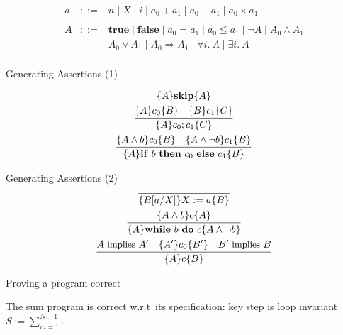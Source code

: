 \begin{frame}
    \[\begin{array}{rcl}
        a & ::= & n
                \mid X
                \mid i
                \mid a_0 + a_1
                \mid a_0 - a_1
                \mid a_0 \times a_1 \\
                \\
        A & ::= & \mathbf{true}
                \mid \mathbf{false}
                \mid a_0 = a_1
                \mid a_0 \leq a_1
                \mid \neg A
                \mid A_0 \wedge A_1 \\
             && A_0 \vee A_1
                \mid A_0 \Rightarrow A_1
                \mid \forall i.\ A
                \mid \exists i.\ A \\
    \end{array} \]
\end{frame}

\begin{frame}{Generating Assertions (1)}
    \begin{gather*}
        \infer{\{A\}\mathbf{skip}\{A\}}{} \\
        \infer{\{A\}c_0; c_1\{C\}}{\{A\}c_0\{B\} \quad \{B\}c_1\{C\}} \\
        \infer{\{A\}\mathbf{if}\ b\ \mathbf{then}\ c_0\ \mathbf{else}\ c_1\{B\}}{\{A \wedge b\}c_0\{B\} \quad \{A \wedge \neg b\}c_1\{B\}} \\
    \end{gather*}
\end{frame}

\begin{frame}{Generating Assertions (2)}
    \begin{gather*}
        \infer{\{B[a/X]\}X := a\{B\}}{} \\
        \infer{\{A\}\mathbf{while}\ b\ \mathbf{do}\ c\{A \wedge \neg b\}}{\{A \wedge b\}c\{A\}} \\
        \infer{\{A\}c\{B\}}{A \textrm{\small{ implies }} A' \quad \{A'\}c_0\{B'\} \quad B' \textrm{\small{ implies }} B} \\
    \end{gather*}
\end{frame}

\begin{frame}{Proving a program correct}
    \begin{theorem}
        The sum program is correct w.r.t~its specification: key step is loop invariant
        $S := \sum_{m=1}^{N-1}$.
    \end{theorem}
\end{frame}


